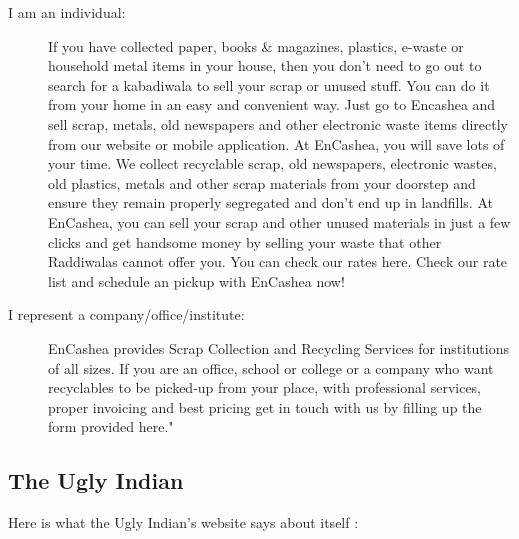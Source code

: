 \documentclass[10pt]{article}
\begin{document}
\begin{description}
	\item[I am an individual:] If you have collected paper, books \& magazines, plastics, e-waste or household metal items in your house, then you don't need to go out to search for a kabadiwala to sell your scrap or unused stuff. You can do it from your home in an easy and convenient way. Just go to Encashea and sell scrap, metals, old newspapers and other electronic waste items directly from our website or mobile application.
	At EnCashea, you will save lots of your time. We collect recyclable scrap, old newspapers, electronic wastes, old plastics, metals and other scrap materials from your doorstep and ensure they remain properly segregated and don't end up in landfills.
	At EnCashea, you can sell your scrap and other unused materials in just a few clicks and get handsome money by selling your waste that other Raddiwalas cannot offer you. You can check our rates here.
	Check our rate list and schedule an pickup with EnCashea now!
	\item[I represent a company/office/institute:] EnCashea provides Scrap Collection and Recycling Services for institutions of all sizes. If you are an office, school or college or a company who want recyclables to be picked-up from your place, with professional services, proper invoicing and best pricing get in touch with us by filling up the form provided here."
\end{description}

\subsection{The Ugly Indian}

Here is what the Ugly Indian's website says about itself \citep{TheUglyIndian:about}:
\end{document}
